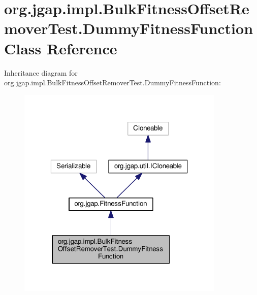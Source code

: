 \hypertarget{classorg_1_1jgap_1_1impl_1_1_bulk_fitness_offset_remover_test_1_1_dummy_fitness_function}{\section{org.\-jgap.\-impl.\-Bulk\-Fitness\-Offset\-Remover\-Test.\-Dummy\-Fitness\-Function Class Reference}
\label{classorg_1_1jgap_1_1impl_1_1_bulk_fitness_offset_remover_test_1_1_dummy_fitness_function}
}


Inheritance diagram for org.\-jgap.\-impl.\-Bulk\-Fitness\-Offset\-Remover\-Test.\-Dummy\-Fitness\-Function\-:
\nopagebreak
\begin{figure}[H]
\begin{center}
\leavevmode
\includegraphics[width=280pt]{classorg_1_1jgap_1_1impl_1_1_bulk_fitness_offset_remover_test_1_1_dummy_fitness_function__inherit__graph}
\end{center}
\end{figure}


